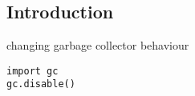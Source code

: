 
\subsection{Introduction}

changing garbage collector behaviour

\begin{verbatim}
import gc
gc.disable()
\end{verbatim}

